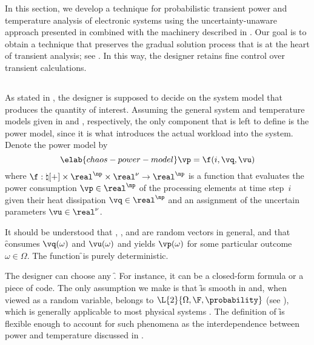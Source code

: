 In this section, we develop a technique for probabilistic transient power and
temperature analysis of electronic systems using the uncertainty-unaware
approach presented in  combined with the machinery
described in . Our goal is to obtain a
technique that preserves the gradual solution process that is at the heart of
transient analysis; see . In this way, the designer
retains fine control over transient calculations.

\subsection{\problemtitle}

As stated in , the designer is supposed to
decide on the system model that produces the quantity of interest. Assuming the
general system and temperature models given in  and
, respectively, the only component that is left to
define is the power model, since it is what introduces the actual workload into
the system. Denote the power model by
\begin{equation} \elab{chaos-power-model}
  \vp = \f(i, \vq, \vu)
\end{equation}
where $\f: \natural[+] \times \real^\np \times \real^\nu \to \real^\np$ is a
function that evaluates the power consumption $\vp \in \real^\np$ of the
processing elements at time step~$i$ given their heat dissipation $\vq \in
\real^\np$ and an assignment of the uncertain parameters $\vu \in \real^\nu$.

\begin{remark}
It should be understood that \vp, \vq, and \vu are random vectors in general,
and that \f consumes $\vq(\omega)$ and $\vu(\omega)$ and yields $\vp(\omega)$
for some particular outcome $\omega \in \Omega$. The function \f \perse is
purely deterministic.
\end{remark}

The designer can choose any \f. For instance, it can be a closed-form formula or
a piece of code. The only assumption we make is that \f is smooth in \vz and,
when viewed as a random variable, belongs to $\L{2}{\Omega, \F, \probability}$
(see ), which is generally applicable to most physical
systems \cite{xiu2010}. The definition of \f is flexible enough to account for
such phenomena as the interdependence between power and temperature discussed in
.

